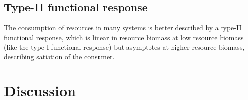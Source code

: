 \documentclass[letter,12pt]{article}
\begin{document}
\subsection{Type-II functional response}

The consumption of resources in many systems is better described by a type-II functional response, which is linear in resource biomass at low resource biomass (like the type-I functional response) but asymptotes at higher resource biomass, describing satiation of the consumer.

\section{Discussion}


\end{document}
